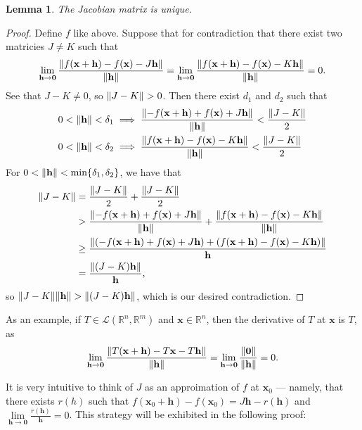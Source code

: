 \documentclass[11pt]{article}
\newtheorem*{lemma*}{Lemma}
\renewcommand{\vec}[1]{\mathbf{#1}}
\begin{document}
\begin{adjustwidth}{1cm}{}
	\begin{lemma*}
		The Jacobian matrix is unique.
	\end{lemma*}
    \begin{proof}\renewcommand{\qedsymbol}{}
		Define $f$ like above. Suppose that for contradiction that there exist two matricies $J \ne K$ such that
		\[
			\lim\limits_{\vec{h} \to \vec{0}} \frac{\norm{f(\vec{x} + \vec{h}) - f(\vec{x}) - J\vec{h}}}{\norm{\vec{h}}}  = \lim\limits_{\vec{h} \to \vec{0}} \frac{\norm{f(\vec{x} + \vec{h}) - f(\vec{x}) - K\vec{h}}}{\norm{\vec{h}}} = 0.
		\]
		See that $J - K \ne 0$, so $\norm{J - K} > 0$. Then there exist $d_{1}$ and $d_{2}$ such that
		\begin{align*}
			0 < \norm{\vec{h}} < \delta_{1} &\implies \frac{ \norm{-f(\vec{x} + \vec{h}) + f(\vec{x}) + J\vec{h}}}{\norm{\vec{h}}} < \frac{\norm{J - K}}{2} \\
			0 < \norm{\vec{h}} < \delta_{2} &\implies \frac{\norm{f(\vec{x} + \vec{h}) - f(\vec{x}) - K\vec{h}}}{\norm{\vec{h}}} < \frac{\norm{J - K}}{2} \\
		\end{align*}
		For $0 < \norm{\vec{h}} < \min \{ \delta_{1}, \delta_{2} \}$, we have that
		\begin{align*}	
			\norm{J - K} &= \frac{\norm{J - K}}{2} + \frac{\norm{J - K}}{2} \\
			&> \frac{ \norm{-f(\vec{x} + \vec{h}) + f(\vec{x}) + J\vec{h}}}{\norm{\vec{h}}} +\frac{\norm{f(\vec{x} + \vec{h}) - f(\vec{x}) - K\vec{h}}}{\norm{\vec{h}}} \\
			&\ge \frac{\norm{(-f(\vec{x} + \vec{h}) + f(\vec{x}) + J \vec{h}) + (f(\vec{x} + \vec{h}) - f(\vec{x}) - K \vec{h})}}{\vec{h}} \\
			&= \frac{\norm{(J - K) \vec{h}}}{\vec{h}},
		\end{align*}
		so $\norm{J - K} \norm{\vec{h}} > \norm{(J - K) \vec{h}}$, which is our desired contradiction.
	\end{proof}
\end{adjustwidth}

As an example, if $T \in \mathcal{L}(\mathbb{R}^{n}, \mathbb{R}^{m})$ and $\vec{x} \in \mathbb{R}^{n}$, then the derivative of $T$ at $\vec{x}$ is $T$, as
\[
	\lim\limits_{\vec{h} \to \vec{0}} \frac{\norm{T(\vec{x} + \vec{h}) - T \vec{x} - T \vec{h}}}{\norm{\vec{h}}} = \lim\limits_{\vec{h} \to \vec{0}} \frac{\norm{\vec{0}}}{\norm{\vec{h}}} = 0.
\]

It is very intuitive to think of $J$ as an approimation of $f$ at $\vec{x}_{0}$ --- namely, that there exists $r(h)$ such that $f(\vec{x}_{0} + \vec{h}) - f(\vec{x}_{0}) = J \vec{h} - r(\vec{h})$ and $\lim\limits_{\vec{h} \to \vec{0}} \tfrac{r(\vec{h})}{\vec{h}} = 0$. This strategy will be exhibited in the following proof:
\end{document}
